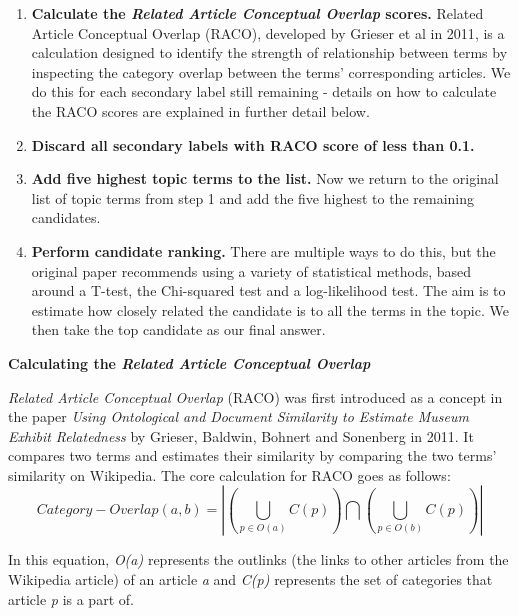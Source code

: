 \documentclass[12pt]{article}
\begin{document}
\begin{enumerate}
	\item \textbf{Calculate the \emph{Related Article Conceptual Overlap} scores.} Related Article Conceptual Overlap (RACO), developed by Grieser et al in 2011\cite{racoCalculation},  is a calculation designed to identify the strength of relationship between terms by inspecting the category overlap between the terms' corresponding articles. We do this for each secondary label still remaining - details on how to calculate the RACO scores are explained in further detail below. \\
	\item \textbf{Discard all secondary labels with RACO  score of less than 0.1.} \\
	\item \textbf{Add five highest topic terms to the list.} Now we return to the original list of topic terms from step 1 and add the five highest to the remaining candidates. \\
	\item \textbf{Perform candidate ranking.} There are multiple ways to do this, but the original paper recommends using a variety of statistical methods, based around a T-test, the Chi-squared test and a log-likelihood test. The aim is to estimate how closely related the candidate is to all the terms in the topic. We then take the top candidate as our final answer. \\
\end{enumerate}

\textbf{Calculating the \emph{Related Article Conceptual Overlap} }

\emph{Related Article Conceptual Overlap } (RACO) was first introduced as a concept in the paper \emph{Using Ontological and Document Similarity to Estimate Museum Exhibit Relatedness}\cite{racoCalculation} by Grieser, Baldwin, Bohnert and Sonenberg in 2011. It compares two terms and estimates their similarity by comparing the two terms' similarity on Wikipedia. The core calculation for RACO goes as follows: 
\[Category-Overlap(a,b) = \left|
\left(\bigcup_{p \in O(a)} C(p)\right) \bigcap \left(\bigcup_{p \in O(b)} C(p)\right)\right|
\]

In this equation, \emph{O(a)} represents the outlinks (the links to other articles from the Wikipedia article) of an article \emph{a} and \emph{C(p)} represents the set of categories that article \emph{p} is a part of.
\end{document}
